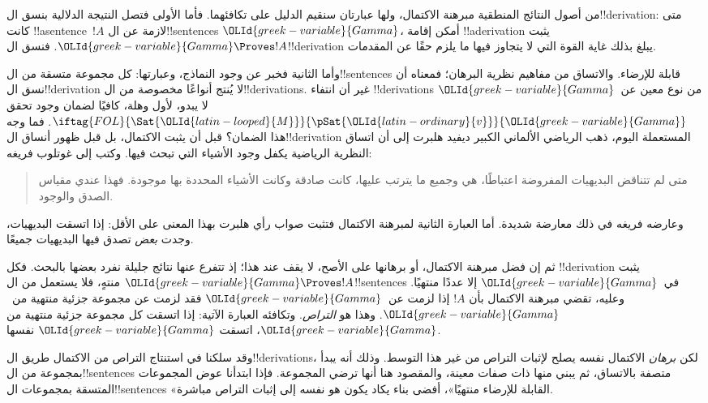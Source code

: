 \documentclass[../../../include/open-logic-section]{subfiles}
\begin{document}
      {}
      {}


من أصول النتائج المنطقية مبرهنة الاكتمال، ولها عبارتان سنقيم الدليل
على تكافئهما. فأما الأولى فتصل النتيجة الدلالية بنسق ال!!{derivation}:
متى كانت !!a{sentence}~$!A$ لازمة عن ال!!{sentence}s ${\OLId{greek-variable}{Gamma}}$، أمكن
إقامة !!a{derivation} يثبت ${\OLId{greek-variable}{Gamma}} \Proves !A$. فنسق ال!!{derivation}
يبلغ بذلك غاية القوة التي لا يتجاوز فيها ما يلزم حقًا عن المقدمات.

وأما الثانية فخبر عن وجود النماذج، وعبارتها: كل مجموعة متسقة من
ال!!{sentence}s قابلة للإرضاء. والاتساق من مفاهيم نظرية البرهان؛ فمعناه
أن نسق ال!!{derivation} لا يُنتج أنواعًا مخصوصة من ال!!{derivation}s.
غير أن انتفاء !!{derivation}s من نوع معين عن~${\OLId{greek-variable}{Gamma}}$ لا يبدو، لأول
وهلة، كافيًا لضمان وجود
تحقق $\iftag{FOL}{\Sat{{\OLId{latin-looped}{M}}}}{\pSat{{\OLId{latin-ordinary}{v}}}}{{\OLId{greek-variable}{Gamma}}}$. فما وجه هذا الضمان؟
قبل أن يثبت الاكتمال، بل قبل ظهور أنساق ال!!{derivation} المستعملة
اليوم، ذهب الرياضي الألماني الكبير ديفيد هلبرت إلى أن اتساق النظرية
الرياضية يكفل وجود الأشياء التي تبحث فيها. وكتب إلى غوتلوب فريغه:
\begin{quote}
  متى لم تتناقض البديهيات المفروضة اعتباطًا، هي وجميع ما يترتب عليها،
  كانت صادقة وكانت الأشياء المحددة بها موجودة. فهذا عندي مقياس الصدق
  والوجود.
\end{quote}
وعارضه فريغه في ذلك معارضة شديدة. أما العبارة الثانية لمبرهنة
الاكتمال فتثبت صواب رأي هلبرت بهذا المعنى على الأقل: إذا اتسقت
البديهيات، وجدت \emph{بعض}
 تصدق فيها البديهيات جميعًا.

ثم إن فضل مبرهنة الاكتمال، أو برهانها على الأصح، لا يقف عند هذا؛ إذ
تتفرع عنها نتائج جليلة نفرد بعضها بالبحث. فكل
!!{derivation} يثبت ${\OLId{greek-variable}{Gamma}} \Proves !A$ منتهٍ، فلا يستعمل من
ال!!{sentence}s في~${\OLId{greek-variable}{Gamma}}$ إلا عددًا منتهيًا. وعليه، تقضي مبرهنة
الاكتمال بأن $!A$ إذا لزمت عن~${\OLId{greek-variable}{Gamma}}$ فقد لزمت عن مجموعة جزئية
منتهية من~${\OLId{greek-variable}{Gamma}}$. وهذا هو \emph{التراص}. وتكافئه العبارة الآتية:
إذا اتسقت كل مجموعة جزئية منتهية من ${\OLId{greek-variable}{Gamma}}$، اتسقت ${\OLId{greek-variable}{Gamma}}$ نفسها.

وقد سلكنا في استنتاج التراص من الاكتمال طريق ال!!{derivation}s، لكن
\emph{برهان} الاكتمال نفسه يصلح لإثبات التراص من غير هذا التوسط.
وذلك أنه يبدأ بمجموعة من ال!!{sentence}s متصفة بالاتساق، ثم يبني
منها  ذات صفات معينة،
والمقصود هنا أنها ترضي المجموعة. فإذا ابتدأنا عوض المجموعات المتسقة
بمجموعات ال!!{sentence}s «القابلة للإرضاء منتهيًا»، أفضى بناء يكاد
يكون هو نفسه إلى إثبات التراص مباشرة.
\end{document}
